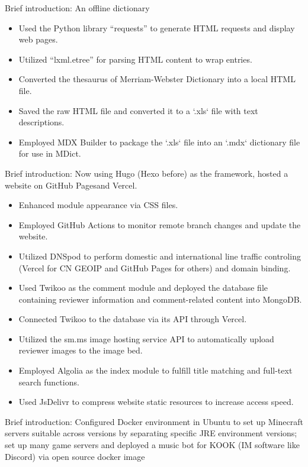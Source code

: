 \documentclass[12pt]{resume}
\begin{document}
Brief introduction: An offline dictionary
\begin{itemize}
  \item Used the Python library “requests” to generate HTML requests and display web pages.
  \item Utilized “lxml.etree” for parsing HTML content to wrap entries.
  \item Converted the thesaurus of Merriam-Webster Dictionary into a local HTML file.
  \item Saved the raw HTML file and converted it to a `.xls` file with text descriptions.
  \item Employed MDX Builder to package the `.xls` file into an `.mdx` dictionary file for use in MDict.
\end{itemize}

Brief introduction: Now using Hugo (Hexo before) as the framework, hosted a website on GitHub Pagesand Vercel.
\begin{itemize}
  \item Enhanced module appearance via CSS files.
  \item Employed GitHub Actions to monitor remote branch changes and update the website.
  \item Utilized DNSpod to perform domestic and international line traffic controling (Vercel for CN GEOIP and GitHub Pages for others) and domain binding.
  \item Used Twikoo as the comment module and deployed the database file containing reviewer information and comment-related content into MongoDB.
  \item Connected Twikoo to the database via its API through Vercel.
  \item Utilized the sm.ms image hosting service API to automatically upload reviewer images to the image bed.
  \item Employed Algolia as the index module to fulfill title matching and full-text search functions.
  \item Used JsDelivr to compress website static resources to increase access speed.
\end{itemize}

Brief introduction: Configured Docker environment in Ubuntu to set up Minecraft servers suitable across versions by separating specific JRE environment versions; set up many game servers and deployed a music bot for KOOK (IM software like Discord) via open source docker image
\end{document}
